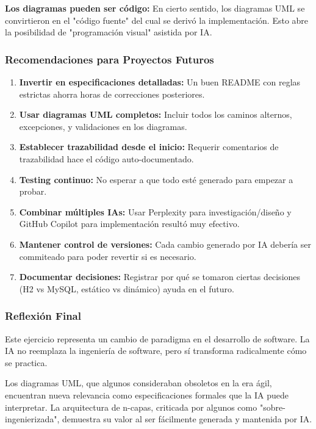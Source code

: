 \documentclass[11pt,a4paper]{article}
\begin{document}
\textbf{Los diagramas pueden ser código:} En cierto sentido, los diagramas UML se convirtieron en el "código fuente" del cual se derivó la implementación. Esto abre la posibilidad de "programación visual" asistida por IA.

\subsubsection{Recomendaciones para Proyectos Futuros}

\begin{enumerate}
    \item \textbf{Invertir en especificaciones detalladas:} Un buen README con reglas estrictas ahorra horas de correcciones posteriores.
    
    \item \textbf{Usar diagramas UML completos:} Incluir todos los caminos alternos, excepciones, y validaciones en los diagramas.
    
    \item \textbf{Establecer trazabilidad desde el inicio:} Requerir comentarios de trazabilidad hace el código auto-documentado.
    
    \item \textbf{Testing continuo:} No esperar a que todo esté generado para empezar a probar.
    
    \item \textbf{Combinar múltiples IAs:} Usar Perplexity para investigación/diseño y GitHub Copilot para implementación resultó muy efectivo.
    
    \item \textbf{Mantener control de versiones:} Cada cambio generado por IA debería ser commiteado para poder revertir si es necesario.
    
    \item \textbf{Documentar decisiones:} Registrar por qué se tomaron ciertas decisiones (H2 vs MySQL, estático vs dinámico) ayuda en el futuro.
\end{enumerate}

\subsubsection{Reflexión Final}

Este ejercicio representa un cambio de paradigma en el desarrollo de software. La IA no reemplaza la ingeniería de software, pero sí transforma radicalmente cómo se practica.

Los diagramas UML, que algunos consideraban obsoletos en la era ágil, encuentran nueva relevancia como especificaciones formales que la IA puede interpretar. La arquitectura de n-capas, criticada por algunos como "sobre-ingenierizada", demuestra su valor al ser fácilmente generada y mantenida por IA.
\end{document}
